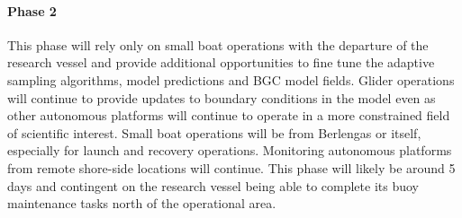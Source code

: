  

 
 
\paragraph{Phase 2} This phase will rely only on small boat operations
with the departure of the research vessel and provide additional
opportunities to fine tune the adaptive sampling algorithms, model
predictions and BGC model fields. Glider operations will continue to
provide updates to boundary conditions in the model even as other
autonomous platforms will continue to operate in a more constrained
field of scientific interest. Small boat operations will be from
Berlengas or \naz itself, especially for launch and recovery operations.
Monitoring autonomous platforms from remote shore-side locations will
continue. This phase will likely be around 5 days and contingent on the
research vessel being able to complete its buoy maintenance tasks north
of the \naz operational area.

